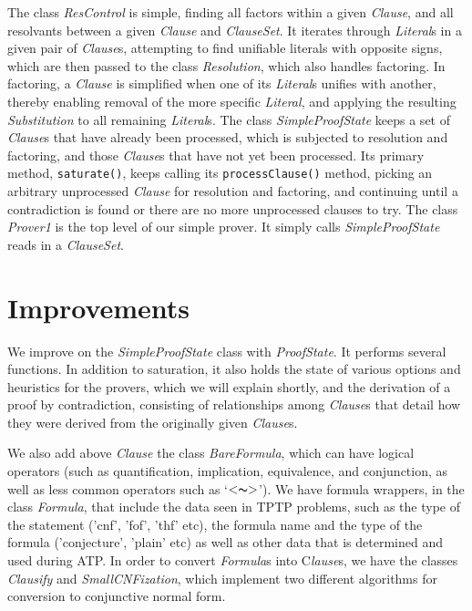 \documentclass{llncs}
\begin{document}
The class \emph{ResControl} is simple, finding all factors within a
given \emph{Clause}, and all resolvants between a given \emph{Clause}
and \emph{ClauseSet}. It
iterates through \emph{Literal}s in a given pair of \emph{Clause}s,
attempting to find unifiable literals with opposite signs, which are
then passed to the class \emph{Resolution}, which also handles factoring.
In factoring, a \emph{Clause} is
simplified when one of its \emph{Literal}s unifies with another,
thereby enabling removal of the more specific \emph{Literal}, and applying
the resulting \emph{Substitution} to all remaining \emph{Literal}s.
  The class \emph{SimpleProofState} keeps a set
of \emph{Clause}s that have already been processed, which is subjected
to resolution and factoring, and those \emph{Clause}s that have not
yet been processed.  Its primary method, \texttt{saturate()}, keeps
calling its \texttt{processClause()} method, picking an arbitrary
unprocessed \emph{Clause} for resolution and factoring, and continuing
until a contradiction is found or there are no more unprocessed
clauses to try.  The class \emph{Prover1} is the top level of our
simple prover.  It simply calls \emph{SimpleProofState} reads in a
\emph{ClauseSet}.

\section{Improvements}

We improve on the \emph{SimpleProofState} class with \emph{ProofState}. It performs
several functions.  In addition to saturation, it also holds the state
of various options and heuristics for the provers, which we will
explain shortly, and the derivation of a proof by contradiction,
consisting of relationships among \emph{Clause}s that detail how they were
derived from the originally given \emph{Clause}s.

We also add above \emph{Clause} the class \emph{BareFormula}, which can have
logical operators (such as quantification, implication, equivalence,
and conjunction, as well as less common operators such as
`$<\thicksim>$').  We have formula wrappers, in the class \emph{Formula},
that include the data seen in TPTP problems, such as the type of the
statement ('cnf', 'fof', 'thf' etc), the formula name and the type of
the formula ('conjecture', 'plain' etc) as well as other data that is
determined and used during ATP. In order to convert \emph{Formula}s into
C\emph{lause}s, we have the classes \emph{Clausify} and \emph{SmallCNFization}, which
implement two different algorithms for conversion to conjunctive normal
form.
\end{document}
